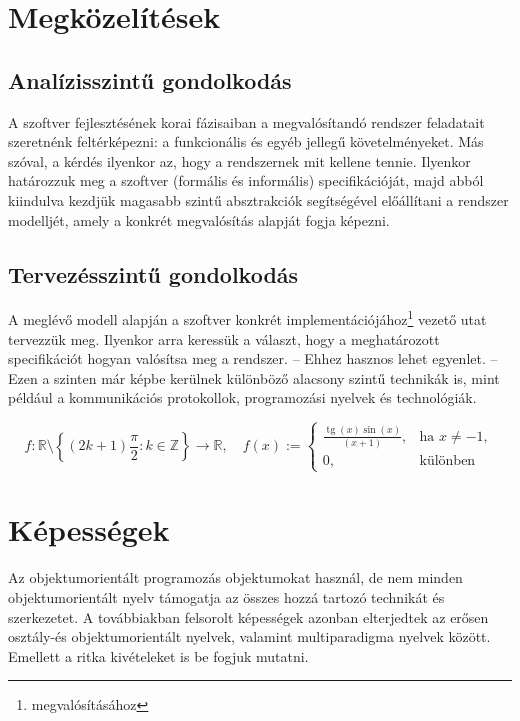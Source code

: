 \documentclass[]{thesis-ekf}
\theoremstyle{definition}
\DeclareMathOperator{\tg}{tg}
\begin{document}
	\chapter{Megközelítések}\label{fejezet-megk}
	
	\section{Analízisszintű gondolkodás}
	
	A szoftver fejlesztésének korai fázisaiban a megvalósítandó rendszer feladatait szeretnénk feltérképezni: a funkcionális és egyéb jellegű követelményeket. Más szóval, a kérdés ilyenkor az, hogy a rendszernek mit kellene tennie. Ilyenkor határozzuk meg a szoftver (formális és informális) specifikációját, majd abból kiindulva kezdjük magasabb szintű absztrakciók segítségével előállítani a rendszer modelljét, amely a konkrét megvalósítás alapját fogja képezni.
	
	\section{Tervezésszintű gondolkodás}
	
	A meglévő modell alapján a szoftver konkrét implementációjához\footnote{megvalósításához} vezető utat tervezzük meg. Ilyenkor arra keressük a választ, hogy a meghatározott specifikációt hogyan valósítsa meg a rendszer. -- Ehhez hasznos lehet \az{\eqref{equation}} egyenlet. -- Ezen a szinten már képbe kerülnek különböző alacsony szintű technikák is, mint például a kommunikációs protokollok, programozási nyelvek és technológiák.
	
	\begin{equation}\label{equation}
		f\colon\mathbb{R}\setminus\left\{(2k+1)\frac{\pi}{2}:k\in\mathbb{Z}\right\}
		\to\mathbb{R},\quad f(x):=
		\begin{cases}
			\frac{\tg(x)\sin(x)}{(x+1)},&\text{ha }x\not=-1,\\
			0,&\text{különben}
		\end{cases}
	\end{equation}
	
	\chapter{Képességek}\label{fejezet-kep}
	
	Az objektumorientált programozás objektumokat használ, de nem minden objektumorientált nyelv támogatja az összes hozzá tartozó technikát és szerkezetet. A továbbiakban felsorolt képességek azonban elterjedtek az erősen osztály-és objektumorientált nyelvek, valamint multiparadigma nyelvek között. Emellett a ritka kivételeket is be fogjuk mutatni. 
	
\end{document}
